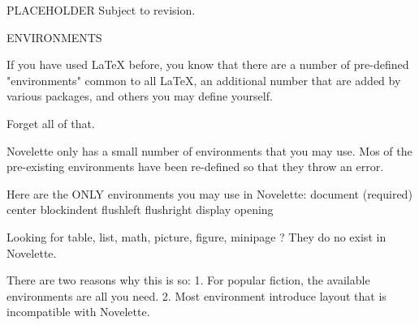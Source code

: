 
PLACEHOLDER
Subject to revision.


ENVIRONMENTS

If you have used LaTeX before, you know that there are a number of pre-defined
"environments" common to all LaTeX, an additional number that are added by
various packages, and others you may define yourself.

Forget all of that.

Novelette only has a small number of environments that you may use.
Mos of the pre-existing environments have been re-defined so that they throw
an error.

Here are the ONLY environments you may use in Novelette:
	document (required)
	center
	blockindent
	flushleft
	flushright
	display
	opening

Looking for table, list, math, picture, figure, minipage ?
They do no exist in Novelette.

There are two reasons why this is so:
	1. For popular fiction, the available environments are all you need.
	2. Most environment introduce layout that is incompatible with Novelette.


